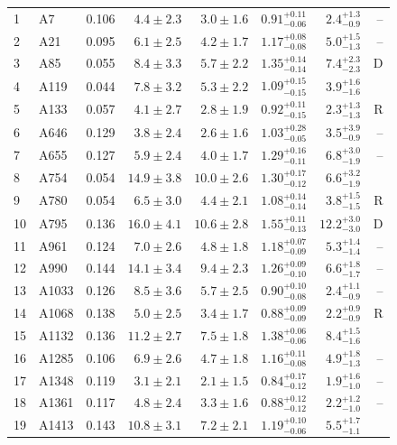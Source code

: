\documentclass[useAMS,usenatbib]{mnras}
\begin{document}
\begin{table}
\begin{tabularx}{1.0\textwidth}{ l l r r r r r r}
1 & A7 & 0.106 & $4.4 \pm 2.3$ & $3.0 \pm 1.6$ & $0.91_{-0.06}^{+0.11}$ & $2.4_{-0.9}^{+1.3}$ & -- \\
2 & A21 & 0.095 & $6.1 \pm 2.5$ & $4.2 \pm 1.7$ & $1.17_{-0.08}^{+0.08}$ & $5.0_{-1.3}^{+1.5}$ & -- \\
3 & A85 & 0.055 & $8.4 \pm 3.3$ & $5.7 \pm 2.2$ & $1.35_{-0.14}^{+0.14}$ & $7.4_{-2.3}^{+2.3}$ & D \\
4 & A119 & 0.044 & $7.8 \pm 3.2$ & $5.3 \pm 2.2$ & $1.09_{-0.15}^{+0.15}$ & $3.9_{-1.6}^{+1.6}$ &  \\
5 & A133 & 0.057 & $4.1 \pm 2.7$ & $2.8 \pm 1.9$ & $0.92_{-0.15}^{+0.11}$ & $2.3_{-1.3}^{+1.3}$ & R \\
6 & A646 & 0.129 & $3.8 \pm 2.4$ & $2.6 \pm 1.6$ & $1.03_{-0.05}^{+0.28}$ & $3.5_{-0.9}^{+3.9}$ & -- \\
7 & A655 & 0.127 & $5.9 \pm 2.4$ & $4.0 \pm 1.7$ & $1.29_{-0.11}^{+0.16}$ & $6.8_{-1.9}^{+3.0}$ & -- \\
8 & A754 & 0.054 & $14.9 \pm 3.8$ & $10.0 \pm 2.6$ & $1.30_{-0.12}^{+0.17}$ & $6.6_{-1.9}^{+3.2}$ &  \\
9 & A780 & 0.054 & $6.5 \pm 3.0$ & $4.4 \pm 2.1$ & $1.08_{-0.14}^{+0.14}$ & $3.8_{-1.5}^{+1.5}$ & R \\
10 & A795 & 0.136 & $16.0 \pm 4.1$ & $10.6 \pm 2.8$ & $1.55_{-0.13}^{+0.11}$ & $12.2_{-3.0}^{+3.0}$ & D \\
11 & A961 & 0.124 & $7.0 \pm 2.6$ & $4.8 \pm 1.8$ & $1.18_{-0.09}^{+0.07}$ & $5.3_{-1.4}^{+1.4}$ & -- \\
12 & A990 & 0.144 & $14.1 \pm 3.4$ & $9.4 \pm 2.3$ & $1.26_{-0.10}^{+0.09}$ & $6.6_{-1.7}^{+1.8}$ & -- \\
13 & A1033 & 0.126 & $8.5 \pm 3.6$ & $5.7 \pm 2.5$ & $0.90_{-0.08}^{+0.10}$ & $2.4_{-0.9}^{+1.1}$ & -- \\
14 & A1068 & 0.138 & $5.0 \pm 2.5$ & $3.4 \pm 1.7$ & $0.88_{-0.09}^{+0.09}$ & $2.2_{-0.9}^{+0.9}$ & R \\
15 & A1132 & 0.136 & $11.2 \pm 2.7$ & $7.5 \pm 1.8$ & $1.38_{-0.06}^{+0.06}$ & $8.4_{-1.6}^{+1.5}$ &  \\
16 & A1285 & 0.106 & $6.9 \pm 2.6$ & $4.7 \pm 1.8$ & $1.16_{-0.08}^{+0.11}$ & $4.9_{-1.3}^{+1.8}$ & -- \\
17 & A1348 & 0.119 & $3.1 \pm 2.1$ & $2.1 \pm 1.5$ & $0.84_{-0.12}^{+0.17}$ & $1.9_{-1.0}^{+1.6}$ & -- \\
18 & A1361 & 0.117 & $4.8 \pm 2.4$ & $3.3 \pm 1.6$ & $0.88_{-0.12}^{+0.12}$ & $2.2_{-1.0}^{+1.2}$ & -- \\
19 & A1413 & 0.143 & $10.8 \pm 3.1$ & $7.2 \pm 2.1$ & $1.19_{-0.06}^{+0.10}$ & $5.5_{-1.1}^{+1.7}$ &  \\

\end{tabularx}
\end{table}
\end{document}
